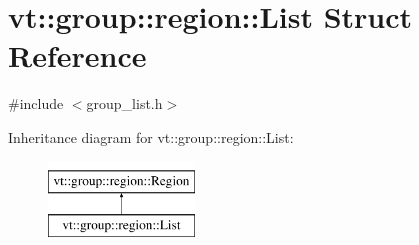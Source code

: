 \hypertarget{structvt_1_1group_1_1region_1_1_list}{}\section{vt\+:\+:group\+:\+:region\+:\+:List Struct Reference}
\label{structvt_1_1group_1_1region_1_1_list}


{\ttfamily \#include $<$group\+\_\+list.\+h$>$}

Inheritance diagram for vt\+:\+:group\+:\+:region\+:\+:List\+:\begin{figure}[H]
\begin{center}
\leavevmode
\includegraphics[height=2.000000cm]{structvt_1_1group_1_1region_1_1_list}
\end{center}
\end{figure}
